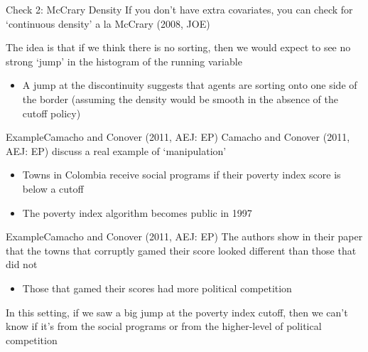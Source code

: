 \documentclass[aspectratio=169,t,11pt,table]{beamer}
\begin{document}
\begin{frame}{Check 2: McCrary Density}{}
  If you don't have extra covariates, you can check for `continuous density' a la McCrary (2008, JOE)

  \bigskip
  The idea is that if we think there is no sorting, then we would expect to see no strong `jump' in the histogram of the running variable
  \begin{itemize}
    \item A jump at the discontinuity suggests that agents are sorting onto one side of the border (assuming the density would be smooth in the absence of the cutoff policy)
  \end{itemize}
\end{frame}


\begin{frame}{Example}{Camacho and Conover (2011, AEJ: EP)}
  Camacho and Conover (2011, AEJ: EP) discuss a real example of `manipulation'
  \begin{itemize}
    \item Towns in Colombia receive social programs if their poverty index score is below a cutoff
     
    \item The poverty index algorithm becomes public in 1997
  \end{itemize}
\end{frame}


\begin{frame}{Example}{Camacho and Conover (2011, AEJ: EP)}
  The authors show in their paper that the towns that corruptly gamed their score looked different than those that did not
  \begin{itemize}
    \item Those that gamed their scores had more political competition
  \end{itemize}

  \bigskip
  In this setting, if we saw a big jump at the poverty index cutoff, then we can't know if it's from the social programs or from the higher-level of political competition 
\end{frame}
\end{document}
